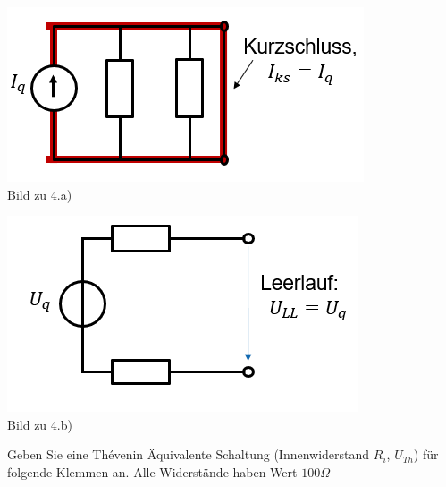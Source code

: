\iend
\begin{center}


	\begin{minipage}{0.4\textwidth}
		\begin{center}
			\includegraphics[scale=0.7]{img/the_ks.PNG} \\
			Bild zu 4.a)
		\end{center}



	\end{minipage}
	\begin{minipage}{0.4\textwidth}
		\begin{center}
			\includegraphics[scale=0.7]{img/the_ll.PNG}\\
			Bild zu 4.b)
		\end{center}
	\end{minipage}

\end{center}





\newpage
{}
\beginbsp
Geben Sie eine Thévenin Äquivalente Schaltung (Innenwiderstand $R_i$, $U_{Th}$) für folgende Klemmen an. Alle Widerstände haben Wert $100\Omega$ \\

